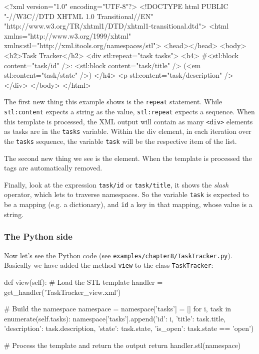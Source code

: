 \begin{code}
    <?xml version="1.0" encoding="UTF-8"?>
    <!DOCTYPE html
         PUBLIC "-//W3C//DTD XHTML 1.0 Transitional//EN"
         "http://www.w3.org/TR/xhtml1/DTD/xhtml1-transitional.dtd">
    <html xmlns="http://www.w3.org/1999/xhtml"
          xmlns:stl="http://xml.itools.org/namespaces/stl">
      <head></head>
      <body>
        <h2>Task Tracker</h2>
        <div stl:repeat="task tasks">
          <h4>
            #<stl:block content="task/id" />:
            <stl:block content="task/title" />
            (<em stl:content="task/state" />)
          </h4>
          <p stl:content="task/description" />
        </div>
      </body>
    </html>
\end{code}

The first new thing this example shows is the {\tt repeat} statement. While
{\tt stl:content} expects a string as the value, {\tt stl:repeat} expects a
sequence. When this template is processed, the XML output will contain as
many {\tt <div>} elements as tasks are in the {\tt tasks} variable. Within
the div element, in each iteration over the {\tt tasks} sequence, the
variable {\tt task} will be the respective item of the list.

The second new thing we see is the {\tt <stl:block>} element. When the
template is processed the {\tt <stl:block>} tags are automatically
removed.

Finally, look at the expression {\tt task/id} or {\tt task/title}, it shows
the {\em slash} operator, which lets to traverse namespaces. So the variable
{\tt task} is expected to be a mapping (e.g. a dictionary), and
{\tt id} a key in that mapping, whose value is a string.

\subsubsection{The Python side}

Now let's see the Python code (see {\tt examples/chapter8/TaskTracker.py}).
Basically we have added the method {\tt view} to the class {\tt TaskTracker}:

\begin{code}
    def view(self):
        # Load the STL template
        handler = get_handler('TaskTracker_view.xml')

        # Build the namespace
        namespace = {}
        namespace['tasks'] = []
        for i, task in enumerate(self.tasks):
            namespace['tasks'].append({'id': i,
                                       'title': task.title,
                                       'description': task.description,
                                       'state': task.state,
                                       'is_open': task.state == 'open'})

        # Process the template and return the output
        return handler.stl(namespace)
\end{code}

